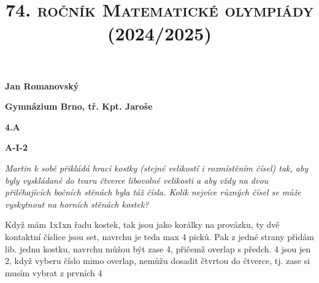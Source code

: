 \documentclass{article}
\title{\normalsize{\vspace{-2cm}\textsc{74. ročník Matematické olympiády (2024/2025)}\vspace{-1.7cm}}}
\date{}
\author{}
\begin{document}
\maketitle

\textbf{ }

\noindent \textbf{Jan Romanovský}

\noindent \textbf{Gymnázium Brno, tř. Kpt. Jaroše}

\noindent \textbf{4.A}

\noindent \textbf{A-\textrm{I}-2}

\textbf{ }

\textit{Martin k sobě přikládá hrací kostky (stejné velikostí i rozmístěním čísel) tak, aby byly vyskládané do tvaru čtverce libovolné velikosti a aby vždy na dvou přiléhajících bočních stěnách byla táž čísla. Kolik nejvíce různých čísel se může vyskytnout na horních stěnách kostek?}

\textbf{ }

Když mám 1x1xn řadu kostek, tak jsou jako korálky na provázku, ty dvě kontaktní číslice jsou set, navrchu je teda max 4 picků. Pak z jedné strany přidám lib. jednu kostku, navrchu můžou být zase 4, přičemž overlap s předch. 4 jsou jen 2, když vyberu číslo mimo overlap, nemůžu dosadit čtvrtou do čtverce, tj. zase si musím vybrat z prvních 4
\end{document}
